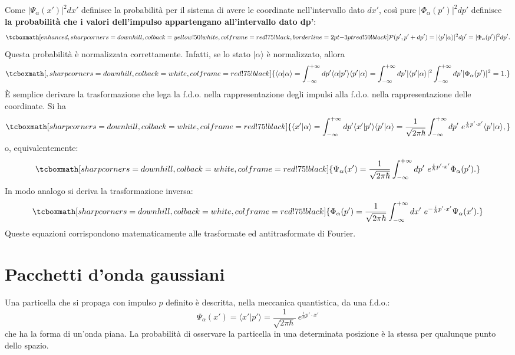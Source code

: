 Come $|\Psi_\alpha (x')|^2 dx'$ definisce la probabilità per il sistema di avere le coordinate nell'intervallo dato $dx'$, così pure $|\Phi_\alpha (p')|^2 dp'$ definisce \textbf{la probabilità che i valori dell'impulso appartengano all'intervallo dato dp'}:
	\begin{equation}
		\tcboxmath[enhanced,sharp corners=downhill ,colback=yellow!50!white,colframe=red!75!black, borderline={2pt}{-3pt}{red!50!black}]{
			\mathcal{P}(p', p'+dp') = |\langle p' | \alpha \rangle|^2 dp' = |\Phi_\alpha (p')|^2 dp'.
			}
	\end{equation}
Questa probabilità è normalizzata correttamente. Infatti, se lo stato $| \alpha \rangle$ è normalizzato, allora
	\begin{equation}
		\tcboxmath[,sharp corners=downhill ,colback=white,colframe=red!75!black]{
			\langle \alpha | \alpha \rangle = \int_{-\infty}^{+\infty} dp' \langle \alpha | p' \rangle \langle p' | \alpha \rangle = \int_{-\infty}^{+\infty} dp' | \langle p' | \alpha \rangle |^2 \int_{-\infty}^{+\infty} dp' |\Phi_\alpha (p')|^2 = 1 .
			}
	\end{equation}
\`E semplice derivare la trasformazione che lega la f.d.o. nella rappresentazione degli impulsi alla f.d.o. nella rappresentazione delle coordinate. Si ha
	\begin{equation}
		\tcboxmath[sharp corners=downhill ,colback=white,colframe=red!75!black]{
			\langle x' | \alpha \rangle = \int_{-\infty}^{+\infty} dp' \langle x' | p' \rangle \langle p' | \alpha \rangle =  \frac{1}{\sqrt{2 \pi \hbar}} \int_{-\infty}^{+\infty} dp' ~ e^{\frac{i}{\hbar}p' \cdot x'} \langle p' | \alpha \rangle ,
			}
	\end{equation}
o, equivalentemente:
	\begin{equation}
		\tcboxmath[sharp corners=downhill ,colback=white,colframe=red!75!black]{
			\Psi_\alpha (x') = \frac{1}{\sqrt{2 \pi \hbar}} \int_{-\infty}^{+\infty} dp' ~ e^{\frac{i}{\hbar}p' \cdot x'} \Phi_\alpha (p').
			}
	\end{equation}
In modo analogo si deriva la trasformazione inversa:
	\begin{equation}
		\tcboxmath[sharp corners=downhill ,colback=white,colframe=red!75!black]{
			\Phi_\alpha (p') = \frac{1}{\sqrt{2 \pi \hbar}} \int_{-\infty}^{+\infty} dx' ~ e^{-\frac{i}{\hbar}p' \cdot x'} \Psi_\alpha (x').
			}
	\end{equation}
Queste equazioni corrispondono matematicamente alle trasformate ed antitrasformate di Fourier.
\section[Pacchetti d'onda gaussiani]{Pacchetti d'onda gaussiani }
Una particella che si propaga con impulso $p$ definito è descritta, nella meccanica quantistica, da una f.d.o.:
	\begin{equation}
		\Psi_\alpha (x') = \langle x' | p' \rangle = \frac{1}{\sqrt{2 \pi \hbar}}~  e^{\frac{i}{\hbar}p' \cdot x'}
	\end{equation}
che ha la forma di un'onda piana. La probabilità di osservare la particella in una determinata posizione è la stessa per qualunque punto dello spazio.\\

